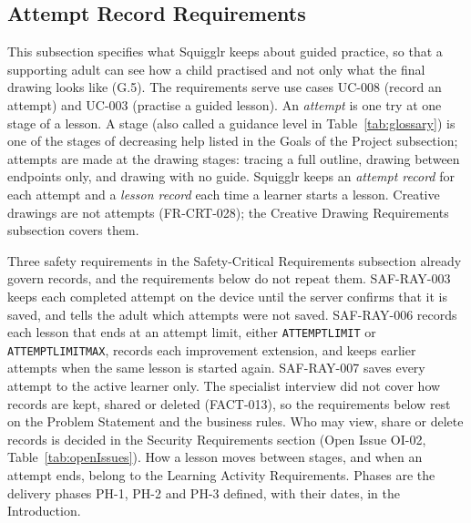 \documentclass[12pt]{article}
\renewcommand{\_}{\textunderscore\allowbreak}%
\begin{document}
\subsection{Attempt Record Requirements}
\label{sec:fr-records}

This subsection specifies what Squigglr keeps about guided practice, so that a
supporting adult can see how a child practised and not only what the final
drawing looks like (G.5). The requirements serve use cases UC-008 (record an
attempt) and UC-003 (practise a guided lesson). An \emph{attempt} is one try at
one stage of a lesson. A stage (also called a guidance level in
Table~\ref{tab:glossary}) is one of the stages of decreasing help listed in the
Goals of the Project subsection; attempts are made at the drawing stages:
tracing a full outline, drawing between endpoints only, and drawing with no
guide. Squigglr keeps an \emph{attempt record} for each attempt and a
\emph{lesson record} each time a learner starts a lesson. Creative drawings are
not attempts (FR-CRT-028); the Creative Drawing Requirements subsection covers
them.

Three safety requirements in the Safety-Critical Requirements subsection already
govern records, and the requirements below do not repeat them. SAF-RAY-003 keeps
each completed attempt on the device until the server confirms that it is saved,
and tells the adult which attempts were not saved. SAF-RAY-006 records each
lesson that ends at an attempt limit, either \texttt{ATTEMPT\_LIMIT} or
\texttt{ATTEMPT\_LIMIT\_MAX}, records each improvement extension, and keeps
earlier attempts when the same lesson is started again. SAF-RAY-007 saves every attempt to
the active learner only. The specialist interview did not cover how records are
kept, shared or deleted (FACT-013), so the requirements below rest on the
Problem Statement and the business rules. Who may view, share or delete records
is decided in the Security Requirements section (Open Issue OI-02,
Table~\ref{tab:openIssues}). How a lesson moves between stages, and when an
attempt ends, belong to the Learning Activity Requirements. Phases are the
delivery phases PH-1, PH-2 and PH-3 defined, with their dates, in the
Introduction.
\end{document}
